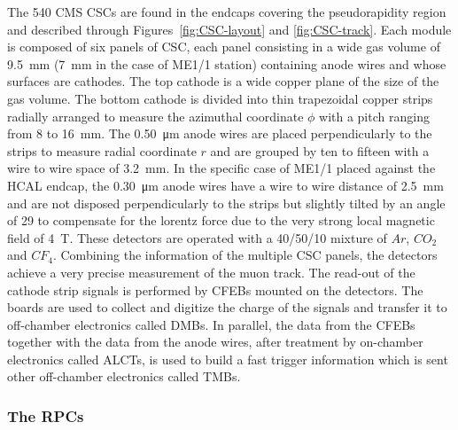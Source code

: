 	The 540 CMS CSCs are found in the endcaps covering the pseudorapidity region  and described through Figures~\ref{fig:CSC-layout} and \ref{fig:CSC-track}. Each module is composed of six panels of CSC, each panel consisting in a wide gas volume of \SI{9.5}{mm} (\SI{7}{mm} in the case of ME1/1 station) containing anode wires and whose surfaces are cathodes. The top cathode is a wide copper plane of the size of the gas volume. The bottom cathode is divided into thin trapezoidal copper strips radially arranged to measure the azimuthal coordinate $\phi$ with a pitch ranging from 8 to \SI{16}{mm}. The \SI{0.50}{\micro m} anode wires are placed perpendicularly to the strips to measure radial coordinate $r$ and are grouped by ten to fifteen with a wire to wire space of \SI{3.2}{mm}. In the specific case of ME1/1 placed against the HCAL endcap, the \SI{0.30}{\micro m} anode wires have a wire to wire distance of \SI{2.5}{mm} and are not disposed perpendicularly to the strips but slightly tilted by an angle of \SI{29}{\deg} to compensate for the lorentz force due to the very strong local magnetic field of \SI{4}{T}. These detectors are operated with a 40/50/10 mixture of $Ar$, $CO_2$ and $CF_4$. Combining the information of the multiple CSC panels, the detectors achieve a very precise measurement of the muon track. The read-out of the cathode strip signals is performed by \acf{CFEBs} mounted on the detectors. The boards are used to collect and digitize the charge of the signals and transfer it to off-chamber electronics called \acf{DMBs}. In parallel, the data from the CFEBs together with the data from the anode wires, after treatment by on-chamber electronics called \acf{ALCTs}, is used to build a fast trigger information which is sent other off-chamber electronics called \acf{TMBs}.
	
		\subsubsection{The \acl{RPC}s}
		\label{chapt4:sssec:RPCs}
	
